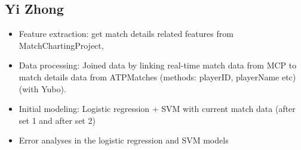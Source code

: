 \documentclass[paper=a4, fontsize=11pt]{scrartcl} %
\numberwithin{equation}{section} %
\numberwithin{figure}{section} %
\numberwithin{table}{section} %
\begin{document}
\subsection{Yi Zhong}
\begin{itemize}
\item Feature extraction: get match details related features from MatchChartingProject, 
\item Data processing: Joined data by linking real-time match data from MCP \cite{tennis_charting} to match details data from ATPMatches \cite{tennis_atp} (methods: playerID, playerName etc) (with Yubo).
\item Initial modeling: Logistic regression + SVM with current match data (after set 1 and after set 2)
\item Error analyses in the logistic regression and SVM models
\end{itemize}


 
\end{document}
